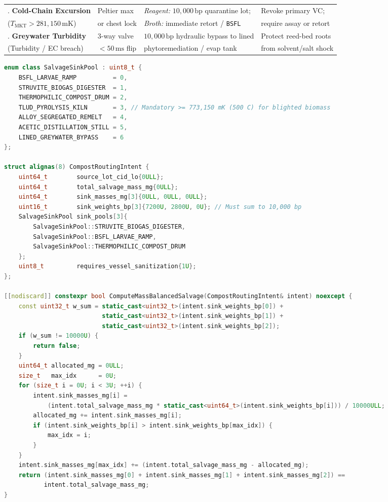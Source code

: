 \begin{table}[htbp]
\begin{tabular}{@{}llll@{}}
\addlinespace[2pt]
5. \textbf{Cold-Chain Excursion} & Peltier max & \emph{Reagent:} $10{,}000\,\mathrm{bp}$ quarantine lot; & Revoke primary VC; \\
($T_{\mathrm{MKT}} > 281{,}150\,\mathrm{mK}$) & or chest lock & \emph{Broth:} immediate retort / \texttt{BSFL} & require assay or retort \\
\addlinespace[2pt]
6. \textbf{Greywater Turbidity} & 3-way valve & $10{,}000\,\mathrm{bp}$ hydraulic bypass to lined & Protect reed-bed roots \\
(Turbidity / EC breach) & $< 50\,\mathrm{ms}$ flip & phytoremediation / evap tank & from solvent/salt shock \\
\bottomrule
\end{tabular}
\end{table}

\begin{lstlisting}[language=C++, caption={Deterministic $10{,}000\,\mathrm{bp}$ mass-conserving \texttt{CompostRoutingIntent} salvage split.}]
enum class SalvageSinkPool : uint8_t {
    BSFL_LARVAE_RAMP          = 0,
    STRUVITE_BIOGAS_DIGESTER  = 1,
    THERMOPHILIC_COMPOST_DRUM = 2,
    TLUD_PYROLYSIS_KILN       = 3, // Mandatory >= 773,150 mK (500 C) for blighted biomass
    ALLOY_SEGREGATED_REMELT   = 4,
    ACETIC_DISTILLATION_STILL = 5,
    LINED_GREYWATER_BYPASS    = 6
};

struct alignas(8) CompostRoutingIntent {
    uint64_t        source_lot_cid_lo{0ULL};
    uint64_t        total_salvage_mass_mg{0ULL};
    uint64_t        sink_masses_mg[3]{0ULL, 0ULL, 0ULL};
    uint16_t        sink_weights_bp[3]{7200U, 2800U, 0U}; // Must sum to 10,000 bp
    SalvageSinkPool sink_pools[3]{
        SalvageSinkPool::STRUVITE_BIOGAS_DIGESTER,
        SalvageSinkPool::BSFL_LARVAE_RAMP,
        SalvageSinkPool::THERMOPHILIC_COMPOST_DRUM
    };
    uint8_t         requires_vessel_sanitization{1U};
};

[[nodiscard]] constexpr bool ComputeMassBalancedSalvage(CompostRoutingIntent& intent) noexcept {
    const uint32_t w_sum = static_cast<uint32_t>(intent.sink_weights_bp[0]) +
                           static_cast<uint32_t>(intent.sink_weights_bp[1]) +
                           static_cast<uint32_t>(intent.sink_weights_bp[2]);
    if (w_sum != 10000U) {
        return false;
    }
    uint64_t allocated_mg = 0ULL;
    size_t   max_idx      = 0U;
    for (size_t i = 0U; i < 3U; ++i) {
        intent.sink_masses_mg[i] =
            (intent.total_salvage_mass_mg * static_cast<uint64_t>(intent.sink_weights_bp[i])) / 10000ULL;
        allocated_mg += intent.sink_masses_mg[i];
        if (intent.sink_weights_bp[i] > intent.sink_weights_bp[max_idx]) {
            max_idx = i;
        }
    }
    intent.sink_masses_mg[max_idx] += (intent.total_salvage_mass_mg - allocated_mg);
    return (intent.sink_masses_mg[0] + intent.sink_masses_mg[1] + intent.sink_masses_mg[2]) ==
           intent.total_salvage_mass_mg;
}
\end{lstlisting}

